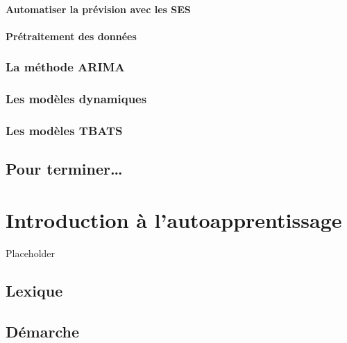 \documentclass[]{book}
\begin{document}
\hypertarget{automatiser-la-pruxe9vision-avec-les-ses}{%
\subsubsection{Automatiser la prévision avec les
SES}\label{automatiser-la-pruxe9vision-avec-les-ses}}

\hypertarget{pruxe9traitement-des-donnuxe9es-1}{%
\subsubsection{Prétraitement des
données}\label{pruxe9traitement-des-donnuxe9es-1}}

\hypertarget{la-muxe9thode-arima}{%
\subsection{La méthode ARIMA}\label{la-muxe9thode-arima}}

\hypertarget{les-moduxe8les-dynamiques}{%
\subsection{Les modèles dynamiques}\label{les-moduxe8les-dynamiques}}

\hypertarget{les-moduxe8les-tbats}{%
\subsection{Les modèles TBATS}\label{les-moduxe8les-tbats}}

\hypertarget{pour-terminer}{%
\section{Pour terminer\ldots{}}\label{pour-terminer}}

\hypertarget{chapitre-ml}{%
\chapter{Introduction à l'autoapprentissage}\label{chapitre-ml}}

Placeholder

\hypertarget{lexique}{%
\section{Lexique}\label{lexique}}

\hypertarget{duxe9marche}{%
\section{Démarche}\label{duxe9marche}}
\end{document}
